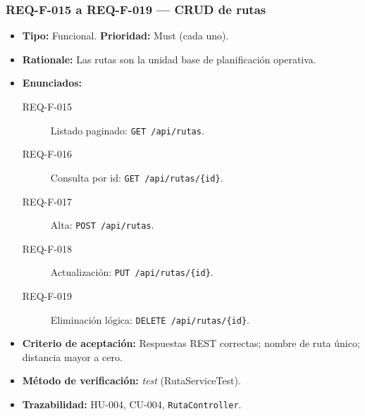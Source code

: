 \documentclass[12pt,a4paper]{article}
\begin{document}
\subsubsection{REQ-F-015 a REQ-F-019 — CRUD de rutas}
\begin{itemize}
  \item \textbf{Tipo:} Funcional. \textbf{Prioridad:} Must (cada uno).
  \item \textbf{Rationale:} Las rutas son la unidad base de planificación operativa.
  \item \textbf{Enunciados:}
    \begin{description}
      \item[REQ-F-015] Listado paginado: \texttt{GET /api/rutas}.
      \item[REQ-F-016] Consulta por id: \texttt{GET /api/rutas/\{id\}}.
      \item[REQ-F-017] Alta: \texttt{POST /api/rutas}.
      \item[REQ-F-018] Actualización: \texttt{PUT /api/rutas/\{id\}}.
      \item[REQ-F-019] Eliminación lógica: \texttt{DELETE /api/rutas/\{id\}}.
    \end{description}
  \item \textbf{Criterio de aceptación:} Respuestas REST correctas; nombre de ruta único;
  distancia mayor a cero.
  \item \textbf{Método de verificación:} \textit{test} (RutaServiceTest).
  \item \textbf{Trazabilidad:} HU-004, CU-004, \texttt{RutaController}.
\end{itemize}

\end{document}
